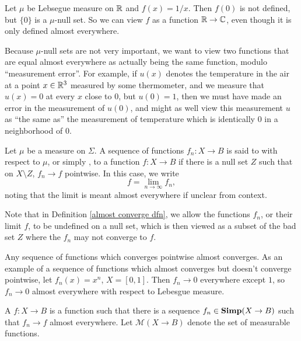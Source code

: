 \begin{example}
Let $\mu$ be Lebsegue measure on $\mathbb{R}$ and $f(x) = 1/x$.
Then $f(0)$ is not defined, but $\{0\}$ is a $\mu$-null set.
So we can view $f$ as a function $\mathbb{R} \to \mathbb{C}$, even though it is only defined almost everywhere.
\end{example}

\begin{subsec}
Because $\mu$-null sets are not very important, we want to view two functions that are equal almost everywhere as actually being the same function, modulo ``measurement error''.
For example, if $u(x)$ denotes the temperature in the air at a point $x \in \mathbb{R}^3$ measured by some thermometer, and we measure that $u(x) = 0$ at every $x$ close to $0$, but $u(0) = 1$, then we must have made an error in the measurement of $u(0)$, and might as well view this measurement $u$ as ``the same as'' the measurement of temperature which is identically $0$ in a neighborhood of $0$.
\end{subsec}

\begin{definition}
\label{almost converge dfn}
Let $\mu$ be a measure on $\Sigma$. A sequence of functions $f_{n}: X \to B$ is said to  with respect to $\mu$, or simply , to a function $f: X \to B$ if there is a null set $Z$ such that on $X \setminus Z$, $f_{n} \to f$ pointwise. In this case, we write
\[f = \lim_{n \to \infty} f_{n},\]
noting that the limit is meant almost everywhere if unclear from context.
\end{definition}

\begin{subsec}
Note that in Definition \ref{almost converge dfn}, we allow the functions $f_{n}$, or their limit $f$, to be undefined on a null set, which is then viewed as a subset of the bad set $Z$ where the $f_{n}$ may not converge to $f$.
\end{subsec}

\begin{example}
Any sequence of functions which converges pointwise almost converges.
As an example of a sequence of functions which almost converges but doesn't converge pointwise, let $f_{n}(x) = x^n$, $X = [0, 1]$. Then $f_{n} \to 0$ everywhere except $1$, so $f_{n} \to 0$ almost everywhere with respect to Lebesgue measure.
\end{example}

\begin{definition}
A  $f: X \to B$ is a function such that there is a sequence $f_{n} \in \mathbf{Simp}(X \to B)$ such that $f_{n} \to f$ almost everywhere.
Let $\mathcal M(X \to B)$ denote the set of measurable functions.
\end{definition}

